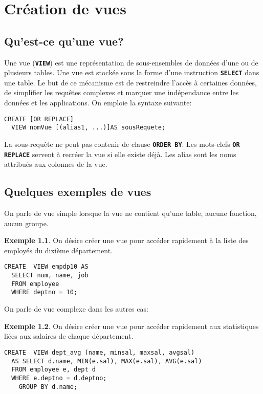 \documentclass[a4paper, 12pt]{report}
\newcommand{\textSQL}[1]{\texttt{\textbf{#1}}}
\theoremstyle{definition} \newtheorem{ex}{Exemple}
\begin{document}
\chapter{Création de vues}
\section[Introduction]{Qu'est-ce qu'une vue?}
Une vue (\textSQL{VIEW}) est une représentation de sous-ensembles de données d'une ou de plusieurs tables. Une vue est stockée sous la forme d'une instruction \textSQL{SELECT} dans une table. Le but de ce mécanisme est de restreindre l'accès à certaines données, de simplifier les requêtes complexes et marquer une indépendance entre les données et les applications. On emploie la syntaxe suivante:
\begin{lstlisting}[frame=single]
CREATE [OR REPLACE]
  VIEW nomVue [(alias1, ...)]AS sousRequete;
\end{lstlisting}

La sous-requête ne peut pas contenir de clause \textSQL{ORDER BY}. Les mots-clefs \textSQL{OR REPLACE} servent à recréer la vue si elle existe déjà. Les alias sont les noms attribués aux colonnes de la vue.

\section{Quelques exemples de vues}
On parle de vue simple lorsque la vue ne contient qu'une table, aucune fonction, aucun groupe.
\begin{ex}
On désire créer une vue pour accéder rapidement à la liste des employés du dixième département.
\begin{lstlisting}[frame=single]
CREATE  VIEW empdp10 AS
  SELECT num, name, job
  FROM employee
  WHERE deptno = 10;
\end{lstlisting}
\end{ex}

On parle de vue complexe dans les autres cas:
\begin{ex}
On désire créer une vue pour accéder rapidement aux statistiques liées aux salaires de chaque département.
\begin{lstlisting}[frame=single]
CREATE  VIEW dept_avg (name, minsal, maxsal, avgsal)
  AS SELECT d.name, MIN(e.sal), MAX(e.sal), AVG(e.sal)
  FROM employee e, dept d
  WHERE e.deptno = d.deptno;
	GROUP BY d.name;
\end{lstlisting}
\end{ex}
\end{document}
